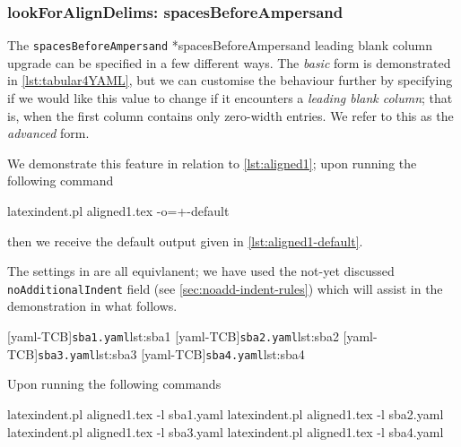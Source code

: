 \subsubsection{lookForAlignDelims: spacesBeforeAmpersand}
 The \texttt{spacesBeforeAmpersand} *{spacesBeforeAmpersand leading
 blank column upgrade} can be specified in a few different ways. The \emph{basic} form is
 demonstrated in \cref{lst:tabular4YAML}, but we can customise the behaviour further by
 specifying if we would like this value to change if it encounters a \emph{leading blank
 column}; that is, when the first column contains only zero-width entries. We refer to
 this as the \emph{advanced} form.%

 \begin{example}
 We demonstrate this feature in relation to \cref{lst:aligned1}; upon running the
 following command

 \begin{commandshell}
latexindent.pl aligned1.tex -o=+-default
\end{commandshell}

 then we receive the default output given in \cref{lst:aligned1-default}.

 \begin{cmhtcbraster}
 \end{cmhtcbraster}

 The settings in  are all equivlanent; we have used the
 not-yet discussed \texttt{noAdditionalIndent} field (see \vref{sec:noadd-indent-rules})
 which will assist in the demonstration in what follows.
 \begin{cmhtcbraster}[raster columns=2, ]
  [yaml-TCB]{\texttt{sba1.yaml}}{lst:sba1}
  [yaml-TCB]{\texttt{sba2.yaml}}{lst:sba2}
  [yaml-TCB]{\texttt{sba3.yaml}}{lst:sba3}
  [yaml-TCB]{\texttt{sba4.yaml}}{lst:sba4}
 \end{cmhtcbraster}
 Upon running the following commands

 \begin{commandshell}
latexindent.pl aligned1.tex -l sba1.yaml
latexindent.pl aligned1.tex -l sba2.yaml
latexindent.pl aligned1.tex -l sba3.yaml
latexindent.pl aligned1.tex -l sba4.yaml
\end{commandshell}


\end{example}
